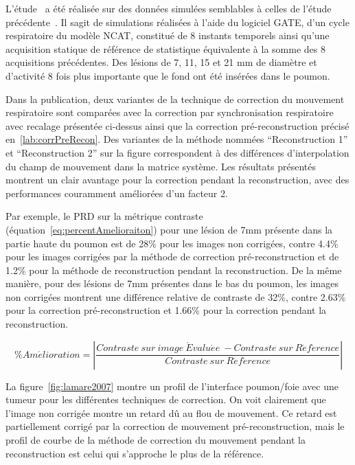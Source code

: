 L'étude~\cite{lamare2007list} a été réalisée sur des données simulées semblables à celles de l'étude précédente~\cite{lamare2007respiratory}. Il sagit de simulations réalisées à l'aide du logiciel GATE, d'un cycle respiratoire du modèle NCAT, constitué de 8 instants temporels ainsi qu'une acquisition statique de référence de statistique équivalente à la somme des 8 acquisitions précédentes. Des lésions de 7, 11, 15 et 21 mm de diamètre et d'activité 8 fois plus importante que le fond ont été insérées dans le poumon.
 
Dans la publication, deux variantes de la technique de correction du mouvement respiratoire sont comparées avec la correction par synchronisation respiratoire avec recalage présentée ci-dessus ainsi que la correction pré-reconstruction précisé en~\ref{lab:corrPreRecon}. Des variantes de la méthode nommées ``Reconstruction 1'' et ``Reconstruction 2'' sur la figure correspondent à des différences d'interpolation du champ de mouvement dans la matrice système. Les résultats présentés montrent un clair avantage pour la correction pendant la reconstruction, avec des performances couramment améliorées d'un facteur 2. 

Par exemple, le PRD sur la métrique contraste (équation~\ref{eq:percentAmelioraiton}) pour une lésion de 7mm présente dans la partie haute du poumon est de 28\% pour les images non corrigées, contre 4.4\% pour les images corrigées par la méthode de correction pré-reconstruction et de 1.2\% pour la méthode de reconstruction pendant la reconstruction. De la même manière, pour des lésions de 7mm présentes dans le bas du poumon, les images non corrigées montrent une différence relative de contraste de 32\%, contre 2.63\% pour la correction pré-reconstruction et 1.66\% pour la correction pendant la reconstruction.


\begin{equation}
 \label{eq:percentAmelioraiton}
 \% Am\acute{e}lioration = \left| \frac{Contraste~sur~image~\acute{E}valu\acute{e}e~-Contraste~sur~R\acute{e}f\acute{e}rence}{Contraste~sur~R\acute{e}f\acute{e}rence} \right|
\end{equation}

La figure~\ref{fig:lamare2007} montre un profil de l'interface poumon/foie avec une tumeur pour les différentes techniques de correction. On voit clairement que l'image non corrigée montre un retard dû au flou de mouvement. Ce retard est partiellement corrigé par la correction de mouvement pré-reconstruction, mais le profil de courbe de la méthode de correction du mouvement pendant la reconstruction est celui qui s'approche le plus de la référence.


